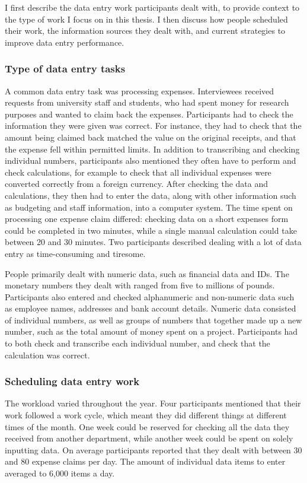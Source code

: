 I first describe the data entry work participants dealt with, to provide context to the type of work I focus on in this thesis. I then discuss how people scheduled their work, the information sources they dealt with, and current strategies to improve data entry performance.

\subsubsection{Type of data entry tasks}
A common data entry task was processing expenses. Interviewees received requests from university staff and students, who had spent money for research purposes and wanted to claim back the expenses. Participants had to check the information they were given was correct. For instance, they had to check that the amount being claimed back matched the value on the original receipts, and that the expense fell within permitted limits. In addition to transcribing and checking individual numbers, participants also mentioned they often have to perform and check calculations, for example to check that all individual expenses were converted correctly from a foreign currency. After checking the data and calculations, they then had to enter the data, along with other information such as budgeting and staff information, into a computer system. The time spent on processing one expense claim differed: checking data on a short expenses form could be completed in two minutes, while a single manual calculation could take between 20 and 30 minutes. Two participants described dealing with a lot of data entry as time-consuming and tiresome.

People primarily dealt with numeric data, such as financial data and IDs. The monetary numbers they dealt with ranged from five to millions of pounds. Participants also entered and checked alphanumeric and non-numeric data such as employee names, addresses and bank account details. Numeric data consisted of individual numbers, as well as groups of numbers that together made up a new number, such as the total amount of money spent on a project. Participants had to both check and transcribe each individual number, and check that the calculation was correct. 

\subsubsection{Scheduling data entry work}
The workload varied throughout the year. Four participants mentioned that their work followed a work cycle, which meant they did different things at different times of the month. One week could be reserved for checking all the data they received from another department, while another week could be spent on solely inputting data. On average participants reported that they dealt with between 30 and 80 expense claims per day. The amount of individual data items to enter averaged to 6,000 items a day. 

